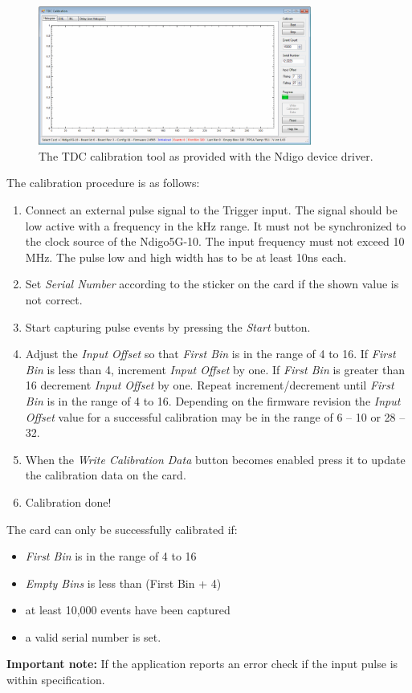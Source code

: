 		\begin{figure}[ht]
			\begin{center}
				\includegraphics[width=0.8\textwidth]{figures/Calib.pdf}
				\caption{\label{fig:Calib}The TDC calibration tool as provided with the Ndigo device driver.}
			\end{center}
		\end{figure}
		
		The calibration procedure is as follows:
		
		\begin{enumerate}
			\item Connect an external pulse signal to the Trigger input. The signal should be low active with a frequency in the kHz range. It must not be synchronized to the clock source of the Ndigo5G-10. The input frequency must not exceed 10 MHz. The pulse low and high width has to be at least 10ns each.
			\item Set \textit{Serial Number} according to the sticker on the card if the shown value is not correct.
			\item Start capturing pulse events by pressing the \textit{Start} button.
			\item Adjust the \textit{Input Offset} so that \textit{First Bin} is in the range of 4 to 16. If \textit{First Bin} is less than 4, increment \textit{Input Offset} by one. If \textit{First Bin} is greater than 16 decrement \textit{Input Offset} by one. Repeat increment/decrement until \textit{First Bin} is in the range of 4 to 16. Depending on 
the firmware revision the \textit{Input Offset} value for a successful calibration may be in the range of 6 – 10 or 28 – 32.
			\item When the \textit{Write Calibration Data} button becomes enabled press it to update the calibration data on the card.
			\item Calibration done!
		\end{enumerate}
		
		The card can only be successfully calibrated if:
		
		\begin{itemize}
			\item \textit{First Bin} is in the range of 4 to 16
			\item \textit{Empty Bins} is less than (First Bin + 4)
			\item at least 10,000 events have been captured
			\item a valid serial number is set.
		\end{itemize}
		
		\textbf{Important note:} If the application reports an error check if the input pulse is within specification.
